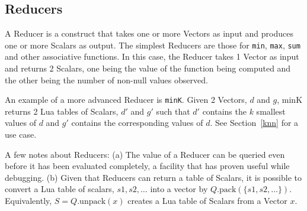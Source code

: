 \newpage
\subsection{Reducers}
\label{reducers}

A Reducer is a construct that takes one or more Vectors as input and produces
one or more Scalars as output. The simplest Reducers are those for {\tt min},
{\tt max}, {\tt sum} and other associative functions. 
In this case, the Reducer takes 1 Vector as input and 
returns 2 Scalars, one
being the value of the function being computed and the other being the number of
non-null values observed. 

An example of a more advanced Reducer is {\tt minK}. 
Given 2 Vectors, \(d\) and \(g\), minK returns 2
Lua tables of Scalars, \(d'\) and \(g'\) such that \(d'\) contains the \(k\)
smallest values of \(d\) and \(g'\) contains the corresponding values of \(d\).
See Section~\ref{knn} for a use case.

A few notes about Reducers: (a) 
The value of a Reducer can be queried even before it has been evaluated 
completely, a facility that has proven useful while debugging. 
(b) Given that Reducers can return a table of Scalars,
it is possible to 
convert a Lua table of scalars, \(s1, s2, \ldots\) into a vector by
\(Q.\mathrm{pack}(\{s1, s2, \ldots\})\).
Equivalently, \(S = Q.\mathrm{unpack}(x)\) creates a Lua table of Scalars from a
Vector \(x\).

